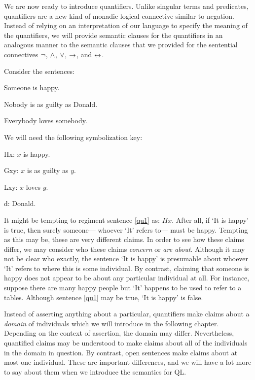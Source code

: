 We are now ready to introduce quantifiers.
Unlike singular terms and predicates, quantifiers are a new kind of monadic logical connective similar to negation.
Instead of relying on an interpretation of our language to specify the meaning of the quantifiers, we will provide semantic clauses for the quantifiers in an analogous manner to the semantic clauses that we provided for the sentential connectives $\neg$, $\wedge$, $\vee$, $\rightarrow$, and $\leftrightarrow$.

Consider the sentences:

\begin{earg}
\item[\ex{qu1}] Someone is happy.
\item[\ex{qu2}] Nobody is as guilty as Donald.
\item[\ex{qu3}] Everybody loves somebody.
\end{earg}

We will need the following symbolization key:

\begin{ekey}
\item[Hx:] $x$ is happy.
\item[Gxy:] $x$ is as guilty as $y$.
\item[Lxy:] $x$ loves $y$.
\item[d:] Donald.
\end{ekey}

It might be tempting to regiment sentence \ref{qu1} as: $Hx$.
After all, if `It is happy' is true, then surely someone--- whoever `It' refers to--- must be happy.
Tempting as this may be, these are very different claims.
In order to see how these claims differ, we may consider who these claims \textit{concern} or \textit{are about}.
Although it may not be clear who exactly, the sentence `It is happy' is presumable about whoever `It' refers to where this is some individual.
By contrast, claiming that someone is happy does not appear to be about any particular individual at all.
For instance, suppose there are many happy people but `It' happens to be used to refer to a tables.
Although sentence \ref{qu1} may be true, `It is happy' is false.

Instead of asserting anything about a particular, quantifiers make claims about a \textit{domain} of individuals which we will introduce in the following chapter.
Depending on the context of assertion, the domain may differ.
Nevertheless, quantified claims may be understood to make claims about all of the individuals in the domain in question.
By contrast, open sentences make claims about at most one individual.
These are important differences, and we will have a lot more to say about them when we introduce the semantics for QL.

